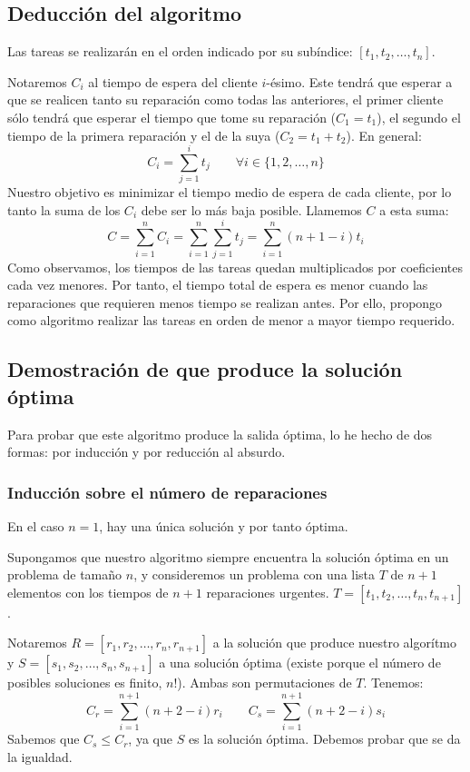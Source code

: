 \documentclass[a4]{article}
\begin{document}
\subsection{Deducción del algoritmo}
Las tareas se realizarán en el orden indicado por su subíndice:
$[t_1, t_2,\ldots,t_n]$.

Notaremos $C_i$ al tiempo de espera del cliente $i$-ésimo. Este tendrá
que esperar a que se realicen tanto su reparación como todas las
anteriores, el primer cliente sólo tendrá que esperar el tiempo que
tome su reparación ($C_1=t_1$), el segundo el tiempo de la primera
reparación y el de la suya ($C_2=t_1+t_2$). En general:
\[C_i=\sum_{j=1}^it_j \qquad \forall i \in \{1,2,\ldots,n\}\]
Nuestro objetivo es minimizar el tiempo medio de espera de cada
cliente, por lo tanto la suma de los $C_i$ debe ser lo más baja
posible. Llamemos $C$ a esta suma:
\[C = \sum_{i=1}^n C_i = \sum_{i=1}^n \sum_{j=1}^i t_j =
  \sum_{i=1}^n(n+1-i)t_i\]
Como observamos, los tiempos de las tareas quedan multiplicados por
coeficientes cada vez menores. Por tanto, el tiempo total de espera es
menor cuando las reparaciones que requieren menos tiempo se realizan
antes. Por ello, propongo como algoritmo realizar las tareas en orden
de menor a mayor tiempo requerido.

\newpage
\subsection{Demostración de que produce la solución óptima}

Para probar que este algoritmo produce la salida óptima, lo he hecho
de dos formas: por inducción y por reducción al absurdo.

\subsubsection{Inducción sobre el número de reparaciones}

En el caso $n=1$, hay una única solución y por tanto óptima.

Supongamos que nuestro algoritmo siempre encuentra la solución óptima
en un problema de tamaño $n$, y consideremos un problema con una
lista $T$ de $n+1$ elementos con los tiempos de $n+1$ reparaciones
urgentes.  $T=[t_1,t_2,\ldots,t_n,t_{n+1}]$.

Notaremos $R=[r_1,r_2,\ldots,r_n,r_{n+1}]$ a la solución que produce
nuestro algorítmo y $S=[s_1,s_2,\ldots,s_n,s_{n+1}]$ a una solución
óptima (existe porque el número de posibles soluciones es finito,
$n!$). Ambas son permutaciones de $T$. Tenemos: \vspace{-4mm}
\[C_r = \sum_{i=1}^{n+1} (n+2-i)r_i \qquad C_s = \sum_{i=1}^{n+1} (n+2-i)s_i\]
Sabemos que $C_s \leq C_r$, ya que $S$ es la solución
óptima. Debemos probar que se da la igualdad.
\end{document}
